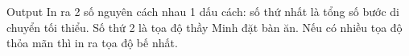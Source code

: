 Output
In ra 2 số nguyên cách nhau 1 dấu cách: số thứ nhất là tổng số bước di chuyển tối thiểu. Số thứ 2 là tọa độ thầy Minh đặt bàn ăn. Nếu có nhiều tọa độ thỏa mãn thì in ra tọa độ bế nhất.